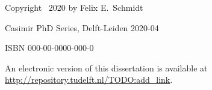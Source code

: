\begin{titlepage}
\vspace{4\bigskipamount}

\noindent Copyright \textcopyright\ 2020 by Felix E.~Schmidt

\noindent Casimir PhD Series, Delft-Leiden 2020-04

\medskip
\noindent ISBN 000-00-0000-000-0

\medskip
\noindent An electronic version of this dissertation is available at \\
\url{http://repository.tudelft.nl/TODO:add_link}.

\end{titlepage}


